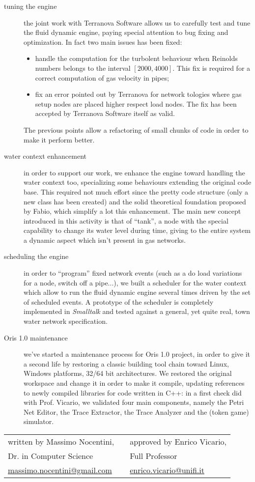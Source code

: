 \documentclass[twoside,openright,titlepage,fleqn,
headinclude,11pt,a4paper,BCOR5mm,footinclude ]{scrbook}
\begin{document}
\begin{description}
\item[tuning the engine] the joint work with Terranova Software allows
  us to carefully test and tune the fluid dynamic engine, paying
  special attention to bug fixing and optimization. In fact two main
  issues has been fixed:
  \begin{itemize}
    \item handle the computation for the turbolent behaviour when
      Reinolds numbers belongs to the interval $[2000, 4000]$. This
      fix is required for a correct computation of gas velocity in
      pipes;
    \item fix an error pointed out by Terranova for network tologies
      where gas setup nodes are placed higher respect load nodes. The
      fix has been accepted by Terranova Software itself as valid.
  \end{itemize}
  The previous points allow a refactoring of small chunks of code in
  order to make it perform better.
  
\item[water context enhancement] in order to support our work, we
  enhance the engine toward handling the water context too,
  specializing some behaviours extending the original code base. This
  required not much effort since the pretty code structure (only a new
  class has been created) and the solid theoretical foundation
  proposed by Fabio, which simplify a lot this enhancement.  The main
  new concept introduced in this activity is that of ``tank'', a node
  with the special capability to change its water level during time,
  giving to the entire system a dynamic aspect which isn't present in
  gas networks.
  \newpage
\item[scheduling the engine] in order to ``program'' fixed network
  events (such as a do load variations for a node, switch off a
  pipe...), we built a scheduler for the water context which allow to
  run the fluid dynamic engine several times driven by the set of
  scheduled events. A prototype of the scheduler is completely
  implemented in \emph{Smalltalk} and tested against a general, yet
  quite real, town water network specification.
  
\item[Oris 1.0 maintenance] we've started a maintenance process for
  Oris 1.0 project, in order to give it a second life by restoring a
  classic building tool chain toward Linux, Windows platforms, 32/64
  bit architectures. We restored the original workspace and change it
  in order to make it compile, updating references to newly compiled
  libraries for code written in C++: in a first check did with
  Prof. Vicario, we validated four main components, namely the Petri Net
  Editor, the Trace Extractor, the Trace Analyzer and the (token game)
  simulator.
\end{description}

\begin{tabular}{ l c l }
  written by Massimo Nocentini,  &  & approved by Enrico Vicario,  \\
  Dr. in Computer Science & & Full Professor \\
  \url{massimo.nocentini@gmail.com} &  & \url{enrico.vicario@unifi.it} \\
\end{tabular}
\end{document}
